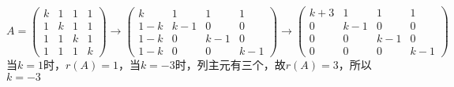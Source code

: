\begin{solution}
    \[
        A =
        \begin{pmatrix}
            k & 1 & 1 & 1 \\
            1 & k & 1 & 1 \\
            1 & 1 & k & 1 \\
            1 & 1 & 1 & k
        \end{pmatrix}
        \longrightarrow
        \begin{pmatrix}
            k   & 1   & 1   & 1   \\
            1-k & k-1 & 0   & 0   \\
            1-k & 0   & k-1 & 0   \\
            1-k & 0   & 0   & k-1
        \end{pmatrix}
        \longrightarrow
        \begin{pmatrix}
            k+3 & 1   & 1   & 1   \\
            0   & k-1 & 0   & 0   \\
            0   & 0   & k-1 & 0   \\
            0   & 0   & 0   & k-1
        \end{pmatrix}
    \]
    当$k=1$时，$r(A)=1$，当$k=-3$时，列主元有三个，故$r(A)=3$，所以$k=-3$
\end{solution}

